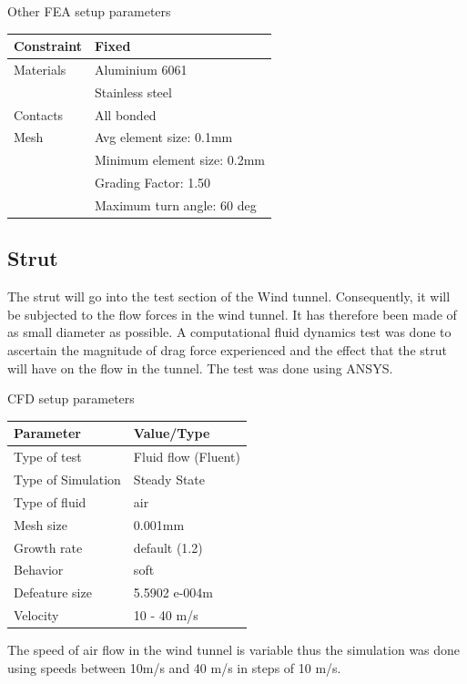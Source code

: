 \begin{center}
	\begin{table}[!h]
		\caption[FEA Setup]{Other FEA setup parameters}
		\centering
	\end{table}
	\begin{tabular}{|l|l|}
		\hline
		Constraint & Fixed                       \\
		\hline
		Materials  & Aluminium 6061              \\
		           & Stainless steel             \\
		\hline
		Contacts   & All bonded                  \\
		\hline
		Mesh       & Avg element size: 0.1mm     \\
		           & Minimum element size: 0.2mm \\
		           & Grading Factor: 1.50        \\
		           & Maximum turn angle: 60 deg  \\
		\hline
	\end{tabular}
\end{center}

\subsection{Strut}
The strut will go into the test section of the Wind tunnel. Consequently, it will be
subjected to the flow forces in the wind tunnel. It has therefore been made of as small diameter as possible.
A computational fluid dynamics test was done to ascertain the magnitude of drag force experienced and the effect that the strut
will have on the flow in the tunnel. The test was done using ANSYS.
\begin{center}
	\begin{table}[!h]
		\caption[CFD Setup]{CFD setup parameters}
		\centering
	\end{table}
	\begin{tabular}{|l|l|}
		\hline
		\textbf{Parameter} & \textbf{Value/Type} \\
		\hline
		Type of test       & Fluid flow (Fluent)         \\
		\hline
		Type of Simulation & Steady State\\
		\hline
		Type of fluid      & air                 \\
		\hline
		Mesh size      &  0.001mm            \\
		\hline
		Growth rate     & default (1.2)             \\
		\hline
		Behavior  & soft             \\
		\hline
		Defeature size      & 5.5902 e-004m               \\
		\hline
		Velocity           & 10 - 40 m/s         \\
		\hline

	\end{tabular}
\end{center}
The speed of air flow in the wind tunnel is variable thus the simulation was done 
using speeds between 10m/s and 40 m/s in steps of 10 m/s.

